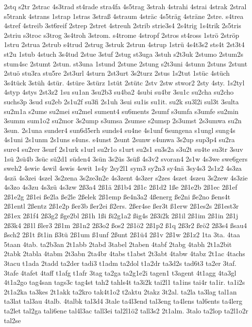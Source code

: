 {2stq
s2tr
2strac
4s3trad
st4rade
stra4fa
4s5trag
3strah
4strahi
4strai
4strak
2stral
s5trank
4strans
1strap
1stras
3straß
4straum
4sträc
4s5träg
4sträne
2stre.
s4trea
4stref
4streib
3st6reif
2strep
2stret
4streuh
2strib
strie3s4
2s4trig
1s4trik
2s5tris
2striu
s3troc
s3trog
3s4troh
3strom.
s4trome
4stropf
2stros
st4ross
1strö
2ströp
1stru
2strua
2strub
s4trud
2strug
3struk
2strun
4strup
1strü
4s4t3s2
sts4t
2st3t4
st2u
1stub
4stuch
3s4tud
2stue
3stuf
2stug
st3uga
3stuh
s2t3uk
2stumo
2stum2s
stum4sc
2stumt
2stun.
st3una
1stund
2stune
2stung
s2t3uni
4stunn
2stuns
2stunt
2stuö
stu3ra
stu5re
2st3url
4sturn
2st3urt
3s2turz
2stus
1s2tut
1stüc
4stüch
3s4tück
3stüh
4stür.
4stüre
3stürz
1stüt
2stütc
2stv
2stw
stwor2
2sty
4sty.
1s2tyl
4styp
4stys
2st3z2
1su
su1an
3su2b3
su4ba2
4subi
su4br
3su1c
su2cha
su2cho
suchs3p
3sud
su2eb
2s1u2f
su3fi
2s1uh
3sui
su1is
su1it.
su2k
su3l2i
sul3t
3sulta
su2m1a
s2ume
su2mei
su2mel
sument4
su6ments
2sumf
s3umfa
s3umfe
su2min
3summ
sum1o2
su2mor
3s2ump
s3umsa
2sumse
s2umsp
2s3umst
2s3umwa
su2n
3sun.
2s1una
sunder4
sun6d5erh
sunds4
su4ne
4s1unf
6sungena
s1ungl
sung4s
4s1uni
2s1unm
2s1uns
s4uns.
s4unst
2sunt
2sunw
s4unwa
3s2up
sup3p4
su2ra
sure4
su2rer
3surf
2s1urk
s1url
su2r1o
s1urt
su2s1
su3s2a
s3u2t
su4te
su3tr
3suv
1sü
2sü4b
3süc
sü2d1
süden4
3sün
3s2üs
3süß
4s3v2
svoran4
2s1w
4s3we
swe6gers
sweh2
4swie
4swil
4swis
4swit
1s4y
2sy2l1
sym3
sy2n3
sy4nä
3sy4s3
2s1z2
4s3za
4szä
4s3zei
4szel
3s2zena
3s2ze3n2e
4s3zent
4s3zer
s2zes
4szet
4szeu
3s2zew
4s3zie
4s3zo
4s3zu
4s3zü
4s3zw
2ß3a4
2ß1ä
2ß1b4
2ß1c
2ß1d2
1ße
2ß1e2b
2ß1ec
2ß1ef
2ß1e2g
2ß1ei
ße2la
ße2le
2ßelek
2ß1emp
ße4n3a2
4ßenerg
ße2ni
ße2no
ßens4t
2ß1entl
2ßentz
2ß1e2p
ßer3b
ßer2ei
ß2ers.
2ßer4se
ßer3t
ß1erw
2ß1es2s
2ß1est3r
2ß1ex
2ß1f4
2ß3g2
ßge2bl
2ß1h
1ßi
ßi2g1a2
ßig4s
2ß3i2k
2ß1il
2ß1im
2ß1in
2ß1j
2ß3k4
2ß1l
ßler3
2ß1m
2ß1n2
2ß3o2
ßos2
2ß1ö2
2ß1p2
ß1q
2ß3r2
ßrö2
2ß3s4
ßsau4
ßsch2
2ß1t
ßt1in
ß3tü
2ß1um
ß1unf
2ßunt
2ß1ü4
2ß1v
2ß1w
2ß1z2
1ta
3ta.
4taa
5taan
4tab.
ta2b3an
2t1abb
2tabd
3tabel
2taben
4tabf
2tabg
4tabh
2t1a2bit
2tabk
2tabla
4tabm
2t3abn
2ta4br
4tabs
t1abst
2t3abt
4tabw
4tabz
2t1ac
4tachs
3tacu
t1ada
2tadd
ta2der
tadi3
t1adm
ta2dol
t1a2dr
ta3d2s
tad6t3
ta2er
3taf.
3tafe
4tafet
4taff
t1afg
t1afr
3tag
ta2ga
ta2g1e2i
tagen1
t3agent
4t1agg
4ta3gl
4t1a2go
tag4san
tags3c
tag4st
tah2
tahls4t
ta3i2k
tai2l1
ta1ins
tai4r
ta1ir.
ta1i2s
2t1a2ka
ta3kes
2t1akk
ta2kro
tak4t1o2
t2aktu
2takz
3t2al.
ta2la
ta3lag
tal1an
ta3lat
tal3au
4talb.
4talbk
tal3d4
3tale
ta4l3end
tal3eng
ta4lens
tal6ents
ta4lerg
ta2let
tal2ga
tali6ene
tal4l3ac
tall3ei
tal2l1ö2
tall3s2
2t1alm.
3talo
ta2lop
ta2l1o2r
tal2se
}
